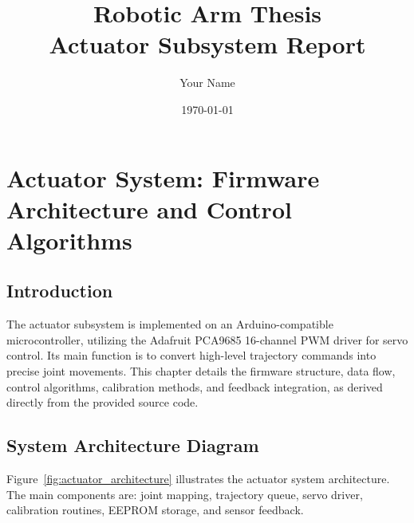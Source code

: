 \documentclass[12pt,a4paper]{report}
\title{Robotic Arm Thesis\\Actuator Subsystem Report}
\author{Your Name}
\date{\today}
\begin{document}
\maketitle

\tableofcontents

\chapter{Actuator System: Firmware Architecture and Control Algorithms}

\section{Introduction}
The actuator subsystem is implemented on an Arduino-compatible microcontroller, utilizing the Adafruit PCA9685 16-channel PWM driver for servo control. Its main function is to convert high-level trajectory commands into precise joint movements. This chapter details the firmware structure, data flow, control algorithms, calibration methods, and feedback integration, as derived directly from the provided source code.

\section{System Architecture Diagram}
Figure~\ref{fig:actuator_architecture} illustrates the actuator system architecture. The main components are: joint mapping, trajectory queue, servo driver, calibration routines, EEPROM storage, and sensor feedback.
\end{document}
